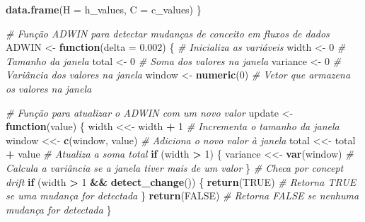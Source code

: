 \documentclass[
]{article}
\newenvironment{Shaded}{\begin{snugshade}}{\end{snugshade}}
\newcommand{\AttributeTok}[1]{\textcolor[rgb]{0.13,0.29,0.53}{#1}}
\newcommand{\CommentTok}[1]{\textcolor[rgb]{0.56,0.35,0.01}{\textit{#1}}}
\newcommand{\ConstantTok}[1]{\textcolor[rgb]{0.56,0.35,0.01}{#1}}
\newcommand{\ControlFlowTok}[1]{\textcolor[rgb]{0.13,0.29,0.53}{\textbf{#1}}}
\newcommand{\DecValTok}[1]{\textcolor[rgb]{0.00,0.00,0.81}{#1}}
\newcommand{\FloatTok}[1]{\textcolor[rgb]{0.00,0.00,0.81}{#1}}
\newcommand{\FunctionTok}[1]{\textcolor[rgb]{0.13,0.29,0.53}{\textbf{#1}}}
\newcommand{\NormalTok}[1]{#1}
\newcommand{\OtherTok}[1]{\textcolor[rgb]{0.56,0.35,0.01}{#1}}
\newcommand{\SpecialCharTok}[1]{\textcolor[rgb]{0.81,0.36,0.00}{\textbf{#1}}}
\begin{document}
\begin{Shaded}
\begin{Highlighting}[]
  \FunctionTok{data.frame}\NormalTok{(}\AttributeTok{H =}\NormalTok{ h\_values, }\AttributeTok{C =}\NormalTok{ c\_values)}
\NormalTok{\}}

\CommentTok{\# Função ADWIN para detectar mudanças de conceito em fluxos de dados}
\NormalTok{ADWIN }\OtherTok{\textless{}{-}} \ControlFlowTok{function}\NormalTok{(}\AttributeTok{delta =} \FloatTok{0.002}\NormalTok{) \{}
  \CommentTok{\# Inicializa as variáveis}
\NormalTok{  width }\OtherTok{\textless{}{-}} \DecValTok{0} \CommentTok{\# Tamanho da janela}
\NormalTok{  total }\OtherTok{\textless{}{-}} \DecValTok{0} \CommentTok{\# Soma dos valores na janela}
\NormalTok{  variance }\OtherTok{\textless{}{-}} \DecValTok{0} \CommentTok{\# Variância dos valores na janela}
\NormalTok{  window }\OtherTok{\textless{}{-}} \FunctionTok{numeric}\NormalTok{(}\DecValTok{0}\NormalTok{) }\CommentTok{\# Vetor que armazena os valores na janela}
  
  \CommentTok{\# Função para atualizar o ADWIN com um novo valor}
\NormalTok{  update }\OtherTok{\textless{}{-}} \ControlFlowTok{function}\NormalTok{(value) \{}
\NormalTok{    width }\OtherTok{\textless{}\textless{}{-}}\NormalTok{ width }\SpecialCharTok{+} \DecValTok{1} \CommentTok{\# Incrementa o tamanho da janela}
\NormalTok{    window }\OtherTok{\textless{}\textless{}{-}} \FunctionTok{c}\NormalTok{(window, value) }\CommentTok{\# Adiciona o novo valor à janela}
\NormalTok{    total }\OtherTok{\textless{}\textless{}{-}}\NormalTok{ total }\SpecialCharTok{+}\NormalTok{ value }\CommentTok{\# Atualiza a soma total}
    \ControlFlowTok{if}\NormalTok{ (width }\SpecialCharTok{\textgreater{}} \DecValTok{1}\NormalTok{) \{}
\NormalTok{      variance }\OtherTok{\textless{}\textless{}{-}} \FunctionTok{var}\NormalTok{(window) }\CommentTok{\# Calcula a variância se a janela tiver mais de um valor}
\NormalTok{    \}}
    \CommentTok{\# Checa por concept drift}
    \ControlFlowTok{if}\NormalTok{ (width }\SpecialCharTok{\textgreater{}} \DecValTok{1} \SpecialCharTok{\&\&} \FunctionTok{detect\_change}\NormalTok{()) \{}
      \FunctionTok{return}\NormalTok{(}\ConstantTok{TRUE}\NormalTok{) }\CommentTok{\# Retorna TRUE se uma mudança for detectada}
\NormalTok{    \}}
    \FunctionTok{return}\NormalTok{(}\ConstantTok{FALSE}\NormalTok{) }\CommentTok{\# Retorna FALSE se nenhuma mudança for detectada}
\NormalTok{  \}}
  

\end{Highlighting}
\end{Shaded}
\end{document}
